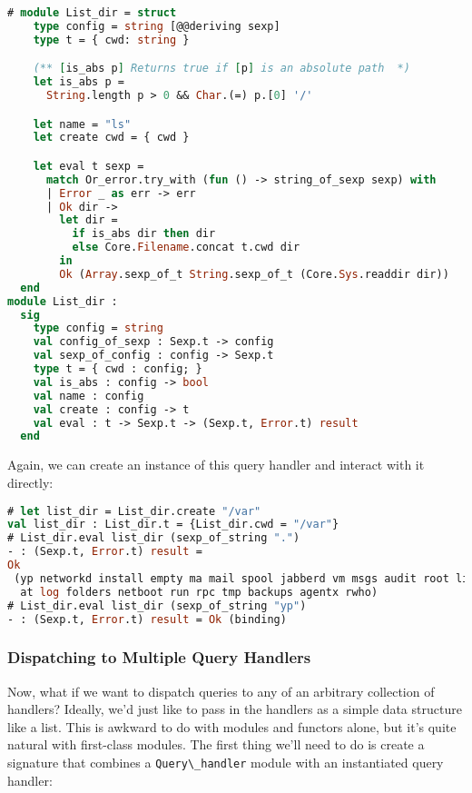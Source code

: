 \begin{lstlisting}[language=Caml]
# module List_dir = struct
    type config = string [@@deriving sexp]
    type t = { cwd: string }

    (** [is_abs p] Returns true if [p] is an absolute path  *)
    let is_abs p =
      String.length p > 0 && Char.(=) p.[0] '/'

    let name = "ls"
    let create cwd = { cwd }

    let eval t sexp =
      match Or_error.try_with (fun () -> string_of_sexp sexp) with
      | Error _ as err -> err
      | Ok dir ->
        let dir =
          if is_abs dir then dir
          else Core.Filename.concat t.cwd dir
        in
        Ok (Array.sexp_of_t String.sexp_of_t (Core.Sys.readdir dir))
  end
module List_dir :
  sig
    type config = string
    val config_of_sexp : Sexp.t -> config
    val sexp_of_config : config -> Sexp.t
    type t = { cwd : config; }
    val is_abs : config -> bool
    val name : config
    val create : config -> t
    val eval : t -> Sexp.t -> (Sexp.t, Error.t) result
  end
\end{lstlisting}

Again, we can create an instance of this query handler and interact with
it directly:

\begin{lstlisting}[language=Caml]
# let list_dir = List_dir.create "/var"
val list_dir : List_dir.t = {List_dir.cwd = "/var"}
# List_dir.eval list_dir (sexp_of_string ".")
- : (Sexp.t, Error.t) result =
Ok
 (yp networkd install empty ma mail spool jabberd vm msgs audit root lib db
  at log folders netboot run rpc tmp backups agentx rwho)
# List_dir.eval list_dir (sexp_of_string "yp")
- : (Sexp.t, Error.t) result = Ok (binding)
\end{lstlisting}

\hypertarget{dispatching-to-multiple-query-handlers}{%
\subsubsection{Dispatching to Multiple Query
Handlers}\label{dispatching-to-multiple-query-handlers}}

Now, what if we want to dispatch queries to any of an arbitrary
collection of handlers? Ideally, we'd just like to pass in the handlers
as a simple data structure like a list. This is awkward to do with
modules and functors alone, but it's quite natural with first-class
modules. The first thing we'll need to do is create a signature that
combines a \passthrough{\lstinline!Query\_handler!} module with an
instantiated query
handler:

